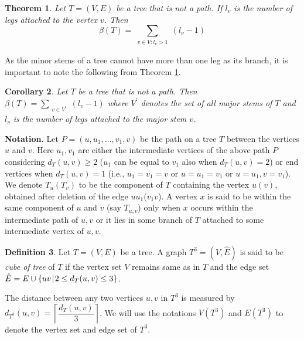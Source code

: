 \documentclass{article}
\newtheorem{thm}{Theorem}[section]
\newtheorem{cor}[thm]{Corollary}
\theoremstyle{definition}
\newtheorem{defn}[thm]{Definition}
\numberwithin{equation}{section}
\begin{document}
\begin{thm}\cite{K}\label{0} 
Let $T=(V, E)$ be a tree that is not a path. If $l_{v}$ is the number of legs attached to the vertex $v$. Then
\begin{equation}
\beta{(T)}= \sum_{\substack{v\in V:l_{v}>1}} (l_{v}-1)
\end{equation}                  
\end{thm}

\noindent As the minor stems of a tree cannot have more than one leg as its branch, it is important to note the following from Theorem \ref{0}. 

\begin{cor}\label{6}
Let $T$ be a tree that is not a path. Then $\beta{(T)}=\sum\limits_{\substack{v\in V^{\prime}}}(l_{v}-1)$ where $V^{\prime}$ denotes the set of all major stems of $T$ and $l_{v}$ is the number of legs attached to the major stem $v$.
\end{cor}

\vspace{0.3em}

\noindent \textbf{Notation.}  Let $P=(u,u_{1},\hdots, v_{1},v)$ be the path on a tree $T$ between the vertices $u$ and $v$. Here $u_{1},v_{1}$ are either the intermediate vertices of the above path $P$ considering $d_{T}(u,v)\geq 2$ ($u_{1}$ can be equal to $v_{1}$ also when $d_{T}(u,v)=2$) or end vertices when $d_{T}(u,v)=1$ (i.e., $u_{1}=v_{1}=v$ or $u=u_{1}=v_{1}$ or $u=u_{1},v=v_{1}$). We denote $T_{u} (T_{v})$ to be the component of $T$ containing the vertex $u (v)$, obtained after deletion of the edge $uu_{1}$($v_{1}v$). A vertex $x$ is said to be within the same component of $u$ and $v$ (say $T_{u,v}$) only when $x$ occurs within the intermediate path of $u,v$ or it lies in some branch of $T$ attached to some intermediate vertex of $u,v$. 


 
\begin{defn}\label{cube of tree}
Let $T=(V,E)$ be a tree. A graph $T^{3}=(V,\hat{E})$ is said to be {\em cube of tree} of $T$ if the vertex set $V$ remains same as in $T$ and the edge set 
$\hat{E}=E\cup \{uv \hspace{0.1em}|\hspace{0.1em}  2\leq d_{T}(u,v)\leq 3\}$. 
\end{defn}

\noindent The distance between any two vertices $u,v$ in $T^{3}$ is measured by $d_{T^{3}}(u,v)=\left\lceil \dfrac{d_{T}(u,v)}{3} \right\rceil$. We will use the notations 
$V(T^{3})$ and $E(T^{3})$ to denote the vertex set and edge set of $T^{3}$.
\end{document}
